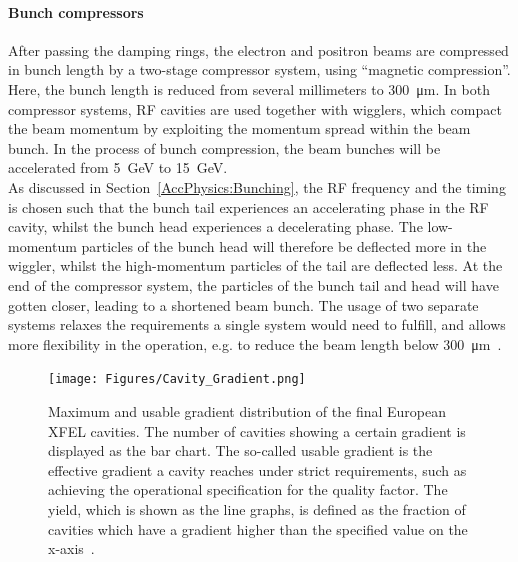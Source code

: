 \paragraph{Bunch compressors}
After passing the damping rings, the electron and positron beams are compressed in bunch length by a two-stage compressor system, using ``magnetic compression''.
Here, the bunch length is reduced from several millimeters to \SI{300}{\micro\meter}.
In both compressor systems, RF cavities are used together with wigglers, which compact the beam momentum by exploiting the momentum spread within the beam bunch.
In the process of bunch compression, the beam bunches will be accelerated from \SI{5}{\GeV} to \SI{15}{\GeV}.
\\As discussed in Section~\ref{AccPhysics:Bunching}, the RF frequency and the timing is chosen such that the bunch tail experiences an accelerating phase in the RF cavity, whilst the bunch head experiences a decelerating phase.
The low-momentum particles of the bunch head will therefore be deflected more in the wiggler, whilst the high-momentum particles of the tail are deflected less.
At the end of the compressor system, the particles of the bunch tail and head will have gotten closer, leading to a shortened beam bunch. 
The usage of two separate systems relaxes the requirements a single system would need to fulfill, and allows more flexibility in the operation, e.g. to reduce the beam length below \SI{300}{\micro\meter}~\cite[p. 124]{TDR32}.

\begin{figure}[h!]
\centering
\texttt{[image: Figures/Cavity\_Gradient.png]}
\caption[XFEL cavity gradient]{Maximum and usable gradient distribution of the final European XFEL cavities.
The number of cavities showing a certain gradient is displayed as the bar chart.
The so-called usable gradient is the effective gradient a cavity reaches under strict requirements, such as achieving the operational specification for the quality factor.
The yield, which is shown as the line graphs, is defined as the fraction of cavities which have a gradient higher than the specified value on the x-axis~\cite[p. 18]{XFEL_Cavities}.}
\label{fig:XFEL_cav}
\end{figure}
